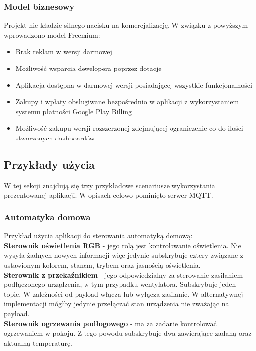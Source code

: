\subsubsection{Model biznesowy}
Projekt nie kładzie silnego nacisku na komercjalizację. W związku z powyższym wprowadzono model Freemium:
\begin{itemize}[leftmargin=*]
    \item Brak reklam w wersji darmowej
    \item Możliwość wsparcia dewelopera poprzez dotacje
    \item Aplikacja dostępna w darmowej wersji posiadającej wszystkie funkcjonalności
    \item Zakupy i wpłaty obsługiwane bezpośrednio w aplikacji z wykorzystaniem systemu płatności Google Play Billing
    \item Możliwość zakupu wersji rozszerzonej zdejmującej ograniczenie co do ilości stworzonych dashboardów
\end{itemize}

\newpage

\subsection{Przykłady użycia}
W tej sekcji znajdują się trzy przykładowe scenariusze wykorzystania prezentowanej aplikacji. W opisach celowo pominięto serwer MQTT.

\subsubsection{Automatyka domowa}
Przykład użycia aplikacji do sterowania automatyką domową:\\

\textbf{Sterownik oświetlenia RGB} - jego rolą jest kontrolowanie oświetlenia. Nie wysyła żadnych nowych informacji więc jedynie subskrybuje cztery  związane z ustawionym kolorem, stanem, trybem oraz jasnością oświetlenia.\\

\textbf{Sterownik z przekaźnikiem} - jego odpowiedzialny za sterowanie zasilaniem podłączonego urządzenia, w tym przypadku wentylatora. Subskrybuje jeden topic. W zależności od payload włącza lub wyłącza zasilanie. W alternatywnej implementacji mógłby jedynie przełączać stan urządzenia nie zważając na payload.\\

\textbf{Sterownik ogrzewania podłogowego} - ma za zadanie kontrolować ogrzewaniem w pokoju. Z tego powodu subskrybuje dwa  zawierające zadaną oraz aktualną temperaturę.\\


